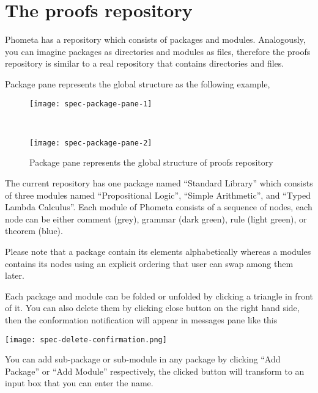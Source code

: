 \documentclass[master.tex]{subfiles}
\begin{document}
\section{The proofs repository}

Phometa has a repository which consists of packages and modules. Analogously,
you can imagine packages as directories and modules as files, therefore the
proofs repository is similar to a real repository that contains directories and
files.

Package pane represents the global structure as the following example,

\begin{figure}[H]
    \centering

\begin{minipage}{0.48\textwidth}
\begin{flushleft}
    \texttt{[image: spec-package-pane-1]}
\end{flushleft}
\end{minipage}
~
\begin{minipage}{0.48\textwidth}
\begin{flushright}
    \texttt{[image: spec-package-pane-2]}
\end{flushright}
\end{minipage}

\caption{Package pane represents the global structure of proofs repository}
\label{fig:specification-package-pane}
\end{figure}

The current repository has one package named ``Standard Library'' which consists
of three modules named ``Propositional Logic'', ``Simple Arithmetic'', and
``Typed Lambda Calculus''. Each module of Phometa consists of a sequence of
nodes, each node can be either comment (grey), grammar (dark green), rule (light
green), or theorem (blue).

Please note that a package contain its elements alphabetically whereas a modules
contains its nodes using an explicit ordering that user can swap among them
later.

Each package and module can be folded or unfolded by clicking a triangle in
front of it. You can also delete them by clicking close button on the right hand
side, then the conformation notification will appear in messages pane like this

\texttt{[image: spec-delete-confirmation.png]}

You can add sub-package or sub-module in any package by clicking ``Add
Package'' or ``Add Module'' respectively, the clicked button will transform to
an input box that you can enter the name.
\end{document}
